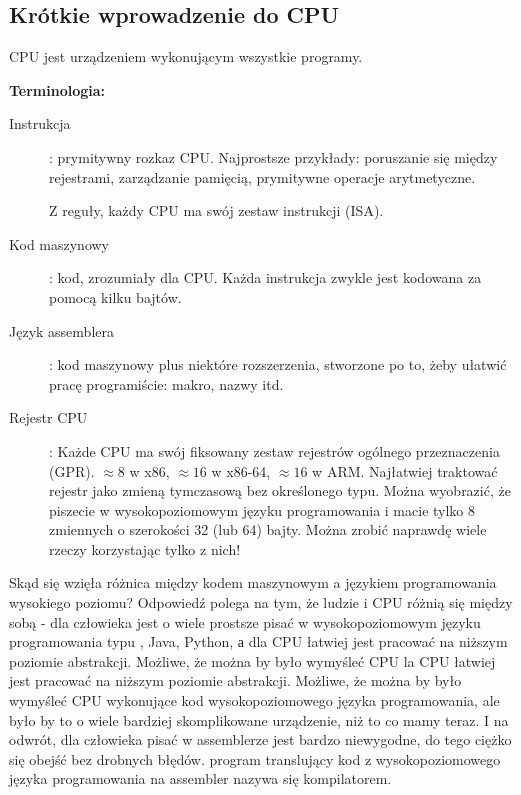 \subsection{Krótkie wprowadzenie do CPU}

\ac{CPU} jest urządzeniem wykonującym wszystkie programy.

\textbf{Terminologia:}

\begin{description}
\item[Instrukcja]: prymitywny rozkaz \ac{CPU}.
Najprostsze przykłady: poruszanie się między rejestrami, zarządzanie pamięcią, prymitywne operacje arytmetyczne. 

Z reguły, każdy \ac{CPU} ma swój zestaw instrukcji (\ac{ISA}).

\item[Kod maszynowy]: kod, zrozumiały dla \ac{CPU}. 
Każda instrukcja zwykle jest kodowana za pomocą kilku bajtów.
\item[Język assemblera]: kod maszynowy plus niektóre rozszerzenia, stworzone po to, żeby ułatwić pracę programiście: makro, nazwy itd.
\item[Rejestr CPU]: Każde \ac{CPU} ma swój fiksowany zestaw rejestrów ogólnego przeznaczenia (\ac{GPR}).
$\approx 8$ w x86, $\approx 16$ w x86-64, $\approx 16$ w ARM.
Najłatwiej traktować rejestr jako zmieną tymczasową bez określonego typu. Można wyobrazić, że piszecie w wysokopoziomowym języku programowania i macie tylko 8 zmiennych o szerokości 32 (lub 64) bajty. Można zrobić naprawdę wiele rzeczy korzystając tylko z nich!
\end{description}

Skąd się wzięła różnica między kodem maszynowym a językiem programowania wysokiego poziomu? Odpowiedź polega na tym, że ludzie i \ac{CPU} różnią się między sobą - dla człowieka jest o wiele prostsze pisać w wysokopoziomowym języku programowania typu \CCpp, Java, Python, а dla \ac{CPU} łatwiej jest pracować na niższym poziomie abstrakcji.
Możliwe, że można by było wymyśleć \ac{CPU} la CPU łatwiej jest pracować na niższym poziomie abstrakcji. Możliwe, że można by było wymyśleć CPU wykonujące kod wysokopoziomowego języka programowania, ale było by to o wiele bardziej skomplikowane urządzenie, niż to co mamy teraz. I na odwrót, dla człowieka pisać w assemblerze jest bardzo niewygodne, do tego ciężko się obejść bez drobnych błędów. program translujący kod z wysokopoziomowego języka programowania na assembler nazywa się kompilatorem.

%
%
%

